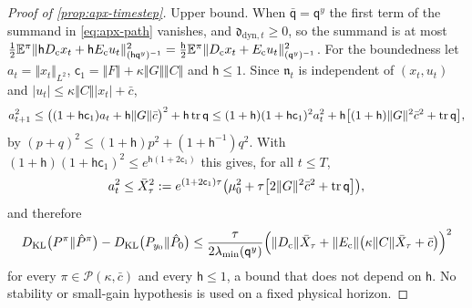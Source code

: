 \begin{proof}[Proof of \cref{prop:apx-timestep}]
Upper bound. When $\bar{\mathsf q}=\mathsf q^y$ the first term of the summand in \cref{eq:apx-path} vanishes, and $\mathfrak d_{\mathrm{dyn},t}\ge0$, so the summand is at most $\frac12\mathbb{E}^\pi\Vert\mathsf hD_{\mathrm c}x_t+\mathsf hE_{\mathrm c}u_t\Vert^2_{(\mathsf h\mathsf q^y)^{-1}}=\frac{\mathsf h}{2}\mathbb{E}^\pi\Vert D_{\mathrm c}x_t+E_{\mathrm c}u_t\Vert^2_{(\mathsf q^y)^{-1}}$. For the boundedness let $a_t=\Vert x_t\Vert_{L^2}$, $\mathsf c_1=\Vert F\Vert+\kappa\Vert G\Vert\Vert C\Vert$ and $\mathsf h\le1$. Since $\mathfrak n_t$ is independent of $(x_t,u_t)$ and $\lvert u_t\rvert\le\kappa\Vert C\Vert\lvert x_t\rvert+\bar c$,
\begin{equation*}
a_{t+1}^2\le\bigl((1+\mathsf h\mathsf c_1)a_t+\mathsf h\Vert G\Vert\bar c\bigr)^2+\mathsf h\operatorname{tr}\mathsf q\le(1+\mathsf h)(1+\mathsf h\mathsf c_1)^2a_t^2+\mathsf h\bigl[(1+\mathsf h)\Vert G\Vert^2\bar c^2+\operatorname{tr}\mathsf q\bigr],
\end{equation*}
by $(p+q)^2\le(1+\mathsf h)p^2+(1+\mathsf h^{-1})q^2$. With $(1+\mathsf h)(1+\mathsf h\mathsf c_1)^2\le e^{\mathsf h(1+2\mathsf c_1)}$ this gives, for all $t\le T$,
\begin{equation*}
a_t^2\le\bar X_\tau^2:=e^{(1+2\mathsf c_1)\tau}\bigl(\mu_0^2+\tau\bigl[2\Vert G\Vert^2\bar c^2+\operatorname{tr}\mathsf q\bigr]\bigr),
\end{equation*}
and therefore
\begin{equation*}
D_{\mathrm{KL}}\bigl(P^\pi\Vert\hat P^\pi\bigr)-D_{\mathrm{KL}}\bigl(P_{y_0}\Vert\hat P_0\bigr)\le\frac{\tau}{2\lambda_{\min}(\mathsf q^y)}\Bigl(\Vert D_{\mathrm c}\Vert\bar X_\tau+\Vert E_{\mathrm c}\Vert\bigl(\kappa\Vert C\Vert\bar X_\tau+\bar c\bigr)\Bigr)^2
\end{equation*}
for every $\pi\in\mathcal P(\kappa,\bar c)$ and every $\mathsf h\le1$, a bound that does not depend on $\mathsf h$. No stability or small-gain hypothesis is used on a fixed physical horizon.
\end{proof}


